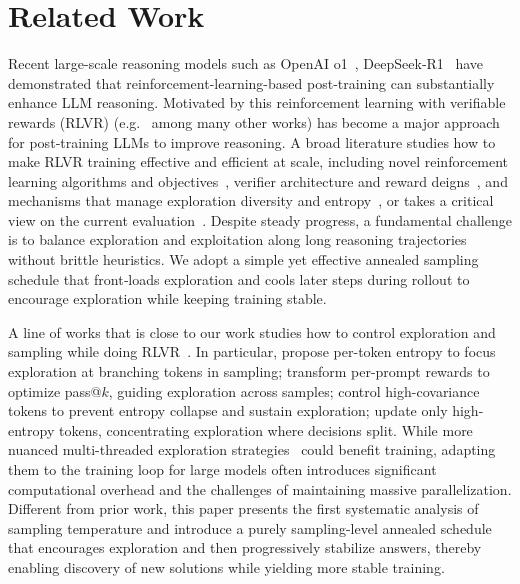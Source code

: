\section{Related Work}
\label{sec: related_work}
  Recent large-scale reasoning models such as OpenAI o1~\citep{openai2024learning}, DeepSeek‑R1~\citep{guo2025deepseek} have demonstrated that reinforcement-learning-based post‑training can substantially enhance LLM reasoning. Motivated by this reinforcement learning with verifiable rewards (RLVR) (e.g.~\citet{shao2024deepseekmath,guo2025deepseek,lambert2024tulu,yang2025qwen3,hu2025open,yu2025dapo,guan2025rstar,zeng2025simplerl} among many other works) has become a major approach for post‑training LLMs to improve reasoning. A broad literature studies how to make RLVR training effective and efficient at scale, including novel reinforcement learning algorithms and objectives~\citep{yu2025dapo,liu2025understanding,yue2025vapo,zheng2025group}, verifier architecture and reward deigns~\citep{zuo2025ttrl,zhao2025learning,agarwal2025unreasonable,prabhudesai2025maximizing}, and mechanisms that manage exploration diversity and entropy~\citep{cheng2025reasoning,chen2025pass,cui2025entropy,wang2025beyond}, or takes a critical view on the current evaluation~\citep{yue2025does,zhao2025echo,hochlehnert2025sober}. Despite steady progress, a fundamental challenge is to balance exploration and exploitation along long reasoning trajectories without brittle heuristics. We adopt a simple yet effective annealed sampling schedule that front‑loads exploration and cools later steps during rollout to encourage exploration while keeping training stable.

 A line of works that is close to our work studies how to control exploration and sampling while doing RLVR~\citep{hou2025t1, cheng2025reasoning,tangoptimizing,chen2025pass,cui2025entropy,wang2025beyond,xiong2025minimalist,deng2025trial,xu2025not,zheng2025act,dou2025improving, li2025treepo}. In particular, \citet{cheng2025reasoning} propose per-token entropy to focus exploration at branching tokens in sampling; \citet{tangoptimizing, chen2025pass} transform per-prompt rewards to optimize pass@$k$, guiding exploration across samples; \citet{cui2025entropy} control high-covariance tokens to prevent entropy collapse and sustain exploration; \citet{wang2025beyond} update only high-entropy tokens, concentrating exploration where decisions split. While more nuanced multi-threaded exploration strategies~\citep{pan2025learning} could benefit training, adapting them to the training loop for large models often introduces significant computational overhead and the challenges of maintaining massive parallelization. Different from prior work, this paper presents the first systematic analysis of sampling temperature and introduce a purely sampling-level annealed schedule that encourages exploration and then progressively stabilize answers, thereby enabling discovery of new solutions while yielding more stable training.

